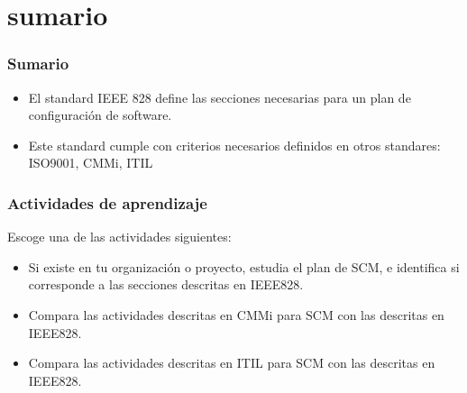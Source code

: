 \section{sumario}
\begin{frame}
	\frametitle{Sumario}
    \begin{itemize}
	    \item El standard IEEE 828 define las secciones necesarias 
		    para un plan de configuraci\'on de software.
	    \item Este standard cumple con criterios necesarios definidos en 
		    otros standares: ISO9001, CMMi, ITIL
    \end{itemize}
\end{frame}
\begin{frame}
	\frametitle{Actividades de aprendizaje}
	Escoge \alert{una} de las actividades siguientes:
	\begin{itemize}
		\item Si existe en tu organizaci\'on o proyecto, estudia el
			plan de SCM, e identifica si corresponde a las 
			secciones descritas en IEEE828. 
		\item Compara las actividades descritas en CMMi para SCM con
			las descritas en IEEE828. 
		\item Compara las actividades descritas en ITIL para SCM con 
			las descritas en IEEE828. 
	\end{itemize}
\end{frame}

